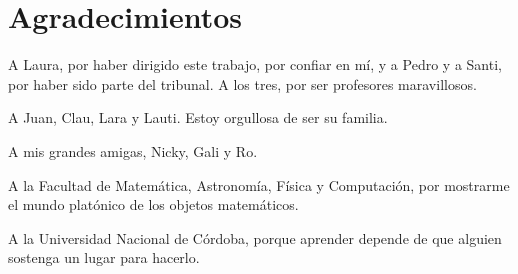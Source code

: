 \chapter*{Agradecimientos}

A Laura, por haber dirigido este trabajo, por confiar en mí, y a Pedro y a Santi, por haber sido parte del tribunal. A los tres, por ser profesores maravillosos.

A Juan, Clau, Lara y Lauti. Estoy orgullosa de ser su familia.

A mis grandes amigas, Nicky, Gali y Ro.

A la Facultad de Matemática, Astronomía, Física y Computación, por mostrarme el mundo platónico de los objetos matemáticos.

A la Universidad Nacional de Córdoba, porque aprender depende de que alguien sostenga un lugar para hacerlo.
